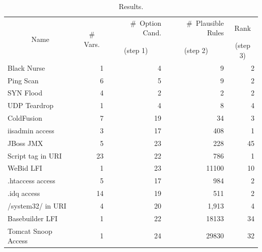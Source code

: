 \documentclass[sigconf,review, anonymous]{acmart}
\begin{document}
\setlength{\tabcolsep}{3pt}
\begin{table}[h!]
  \small
  \caption{\label{table:results}Results.}
  \vspace{-2ex}
  \centering
  \begin{tabular}{lrrrr}
    \toprule
    \multicolumn{1}{c}{\multirow{2}{*}{Name}} &
    \multicolumn{1}{c}{\multirow{2}{*}{\# Vars.}} &
    \#~Option Cand. &
    \#~Plausible Rules &    
    \multicolumn{1}{c}{Rank} \\

     &
    \multicolumn{1}{c}{} &
    \multicolumn{1}{c}{(step 1)} &
    \multicolumn{1}{c}{(step 2)} &    
    \multicolumn{1}{c}{(step 3)} \\

    \midrule
    Black Nurse & 1 & 4 & 9 & 2 \\    
    Ping Scan & 6 & 5 & 9 & 2 \\
    SYN Flood & 4 & 2 & 2 & 2 \\
    UDP Teardrop & 1 & 4 & 8 & 4 \\
    \midrule
    ColdFusion & 7 & 19 & 34 & 3\\
    iisadmin access & 3 & 17 & 408 & 1 \\        
    JBoss JMX & 5 & 23 & 228 & 45 \\
    Script tag in URI & 23 & 22 & 786 & 1 \\
    WeBid LFI & 1 & 23 & 11100 & 10\\    
    .htaccess access & 5 & 17 & 984 & 2\\
    .idq access & 14 & 19 & 511 & 2 \\
    /system32/ in URI & 4 & 20 & 1,913 & 4 \\
    Basebuilder LFI & 1 & 22 & 18133 & 34 \\
    Tomcat Snoop Access & 1 & 24 & 29830 & 32 \\
    \bottomrule
  \end{tabular}
\end{table}
\end{document}
